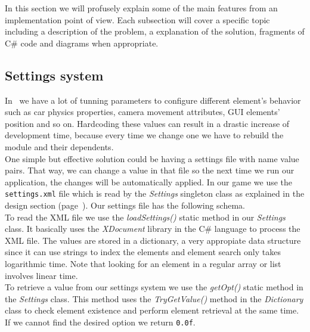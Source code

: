 
In this section we will profusely explain some of the main features
from an implementation point of view. Each subsection will cover a specific
topic including a description of the problem, a explanation of the solution,
fragments of C\# code and diagrams when appropriate.

\subsection{Settings system}

In \game\ we have a lot of tunning parameters to configure different element's
behavior such as car physics properties, camera movement attributes, GUI
elements' position and so on. Hardcoding these values can result in a drastic
increase of development time, because every time we change one we have to
rebuild the module and their dependents.\\

One simple but effective solution could be having a settings file with
name value pairs. That way, we can change a value in that file so the next time
we run our application, the changes will be automatically applied. In our
game we use the \texttt{settings.xml} file which is read by the \textit{Settings}
singleton class as explained in the design section (page~\pageref{sec:design-system}).
Our settings file has the following schema.\\



To read the XML file we use the \textit{loadSettings()} static method in our
\textit{Settings} class. It basically uses the \textit{XDocument} library
in the C\# language to process the XML file. The values are stored in a dictionary,
a very appropiate data structure since it can use strings to index the elements
and element search only takes logarithmic time. Note that looking for an element
in a regular array or list involves linear time.\\



To retrieve a value from our settings system we use the \textit{getOpt()} static
method in the \textit{Settings} class. This method uses the \textit{TryGetValue()}
method in the \textit{Dictionary} class to check element existence and perform
element retrieval at the same time. If we cannot find the desired option
we return \texttt{0.0f}.\\


